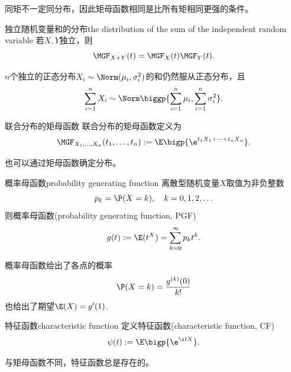 \begin{corollary}
	同矩不一定同分布，因此矩母函数相同是比所有矩相同更强的条件。
\end{corollary}
\begin{theorem}{独立随机变量和的分布}{the distribution of the sum of the independent random variable}
	若$X,Y$独立，则
	\[
		\MGF_{X+Y}(t)=\MGF_X(t)\MGF_Y(t).
	\]
\end{theorem}
\begin{corollary}
	$n$个独立的正态分布$X_i\sim\Norm(\mu_i,\sigma_i^2)$的和仍然服从正态分布，且
	\[
		\sum_{i=1}^nX_i\sim\Norm\biggp{\sum_{i=1}^n\mu_i,\sum_{i=1}^n\sigma_i^2}.
	\]
\end{corollary}
\begin{definition}{联合分布的矩母函数}{}
	联合分布的矩母函数定义为
	\begin{equation}
		\MGF_{X_1,\ldots,X_n}(t_1,\ldots,t_n):=\E\bigp{\e^{t_1X_1+\cdots+t_nX_n}}.
	\end{equation}
\end{definition}
也可以通过矩母函数确定分布。
\begin{definition}{概率母函数}{probability generating function}
	离散型随机变量$X$取值为非负整数
	\[
		p_k=\P(X=k),\quad k=0,1,2,\ldots
	\]
	则概率母函数(probability generating function, PGF)
	\[
		g(t):=\E(t^X)=\sum_{k=0}^\infty p_kt^k.
	\]
\end{definition}
概率母函数给出了各点的概率
\[
	\P(X=k)=\frac{g^{(k)}(0)}{k!}
\]
也给出了期望$\E(X)=g'(1)$.
\begin{definition}{特征函数}{characteristic function}
	定义特征函数(characteristic function, CF)
	\begin{equation}\label{CF-def}
		\psi(t):=\E\bigp{\e^{\i tX}}.
	\end{equation}
\end{definition}
与矩母函数不同，特征函数总是存在的。
